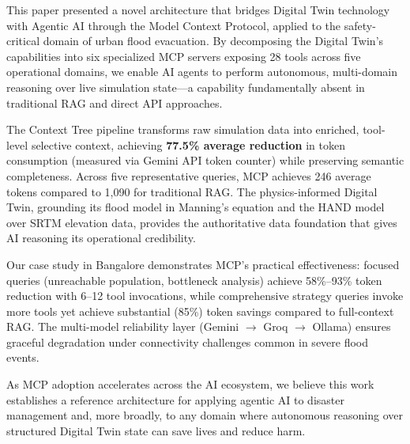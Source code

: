 \documentclass[journal]{IEEEtran}
\begin{document}
This paper presented a novel architecture that bridges Digital Twin technology
with Agentic AI through the Model Context Protocol, applied to the
safety-critical domain of urban flood evacuation. By decomposing the Digital
Twin's capabilities into six specialized MCP servers exposing 28 tools across
five operational domains, we enable AI agents to perform autonomous,
multi-domain reasoning over live simulation state---a capability fundamentally
absent in traditional RAG and direct API approaches.

The Context Tree pipeline transforms raw simulation data into enriched,
tool-level selective context, achieving \textbf{77.5\% average reduction} in token
consumption (measured via Gemini API token counter) while preserving semantic completeness. Across five representative
queries, MCP achieves 246 average tokens compared to 1,090 for traditional RAG.
The physics-informed Digital Twin, grounding its flood model in Manning's equation
and the HAND model over SRTM elevation data, provides the authoritative data
foundation that gives AI reasoning its operational credibility.

Our case study in Bangalore demonstrates MCP's practical effectiveness:
focused queries (unreachable population, bottleneck analysis) achieve 58\%--93\%
token reduction with 6--12 tool invocations, while comprehensive strategy
queries invoke more tools yet achieve substantial (85\%) token savings compared
to full-context RAG. The multi-model reliability layer (Gemini $\to$ Groq $\to$ Ollama)
ensures graceful degradation under connectivity challenges common in severe
flood events.

As MCP adoption accelerates across the AI ecosystem, we believe this work
establishes a reference architecture for applying agentic AI to disaster
management and, more broadly, to any domain where autonomous reasoning
over structured Digital Twin state can save lives and reduce harm.
\end{document}
